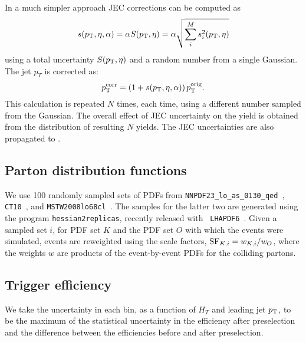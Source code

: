 In a much simpler approach JEC corrections can be computed as
\begin{equation}
s(p_{\mathrm{T}}, \eta, \alpha) = \alpha S (p_{\mathrm{T}}, \eta) = \alpha \sqrt {\sum_i^M s_i^2 (p_{\mathrm{T}}, \eta) }
\end{equation}
using a total uncertainty $S (p_{\mathrm{T}}, \eta)$ and a random number from a single Gaussian.  
The jet $p_T$ is corrected as:
\begin{equation}
p_{\mathrm{T}}^{\rm corr} = \left(1 + s(p_{\mathrm{T}}, \eta, \alpha)\right) p_{\mathrm{T}}^{\rm orig}.
\end{equation}
This calculation is repeated $N$ times, each time, using a different number sampled from the
Gaussian.  
The overall effect of JEC uncertainty on the yield is obtained from the distribution of resulting
$N$ yields.  
The JEC uncertainties are also propagated to \ETm .


\subsection{Parton distribution functions} 

We use 100 randomly sampled sets of PDFs from {\tt NNPDF23\_lo\_as\_0130\_qed}~\cite{nnpdf}, {\tt
CT10}~\cite{Lai:2010vv}, and {\tt MSTW2008lo68cl}~\cite{Martin:2009iq}.  The samples for the latter
two are generated using the program {\tt hessian2replicas}, recently released with {\tt
LHAPDF6}~\cite{LHAPDF6}. Given a sampled set $i$, for PDF set $K$ and the PDF set $O$ with which the
events were simulated, events are reweighted using the scale factors, ${\rm SF}_{K, i} = w_{K, i} /
w_{O}$,
where the weights $w$ are products of the event-by-event PDFs for the colliding partons.

\subsection{Trigger efficiency}  

We take the uncertainty in each bin, as a function of $H_T$
and leading jet $p_{\mathrm{T}}$, to be the maximum of the statistical uncertainty in the efficiency after
preselection and the difference between the efficiencies before and after preselection. 
% 


